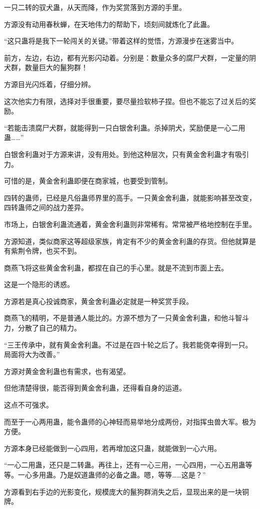 \begin{this_body}
一只二转的驭犬蛊，从天而降，作为奖赏落到方源的手里。

方源没有动用春秋蝉，在天地伟力的帮助下，顷刻间就炼化了此蛊。

“这只蛊将是我下一轮闯关的关键。”带着这样的觉悟，方源漫步在迷雾当中。

前方，左边，右边，都有光影闪动着。分别是：数量众多的腐尸犬群，一定量的阴犬群，数量巨大的鬣狗群！

方源目光闪烁着，仔细分辨。

这次他实力有限，选择对手很重要，要尽量捡软柿子捏。但也不能忘了过关后的奖励。

“若能击溃腐尸犬群，就能得到一只白银舍利蛊。杀掉阴犬，奖励便是一心二用蛊……”

白银舍利蛊对于方源来讲，没有用处。到他这种层次，只有黄金舍利蛊才有吸引力。

可惜的是，黄金舍利蛊即便在商家城，也要受到管制。

四转的蛊师，已经是凡俗蛊师界里的高手。一只黄金舍利蛊，就能影响甚至改变，四转蛊师之间的战力差异。

市场上，白银舍利蛊流通着，黄金舍利蛊则非常稀有。常常被严格地控制在手里。

方源知道，类似商家这等超级家族，肯定有不少的黄金舍利蛊的存货。但他就算是有紫荆令牌，也买不到。

商燕飞将这些黄金舍利蛊，都捏在自己的手心里。就是不流到市面上去。

这是一个隐形的诱惑。

方源若是真心投诚商家，黄金舍利蛊必定就是一种奖赏手段。

商燕飞的精明，不是普通人能比的。方源不想为了一只黄金舍利蛊，和他斗智斗力，分散了自己的精力。

“三王传承中，就有黄金舍利蛊。不过是在四十轮之后了。我若能侥幸得到一只。局面将大为改善。”

方源对黄金舍利蛊也有需求，也有渴望。

但他清楚得很，能否得到黄金舍利蛊，还得看自身的运道。

这点不可强求。

而至于一心两用蛊，能令蛊师的心神轻而易举地分成两份，对指挥虫兽大军。极为方便。

方源本身已经能做到一心四用，若再增加这只蛊，就能做到一心六用。

“一心二用蛊，还只是二转蛊。再往上，还有一心三用，一心四用，一心五用蛊等等。一心多用蛊。乃是奴道蛊师的必备之蛊。嗯，等等……这是？”

方源看到右手边的光影变化，规模庞大的鬣狗群消失之后，显现出来的是一块铜牌。


\end{this_body}
